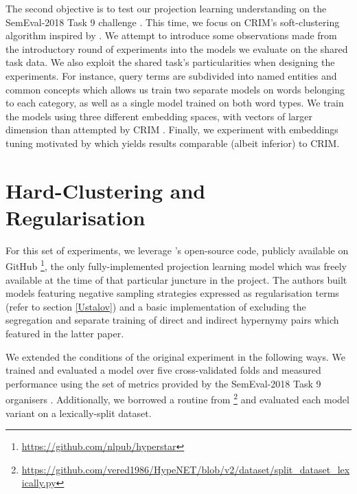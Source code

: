 The second objective is to test our projection learning understanding on the SemEval-2018 Task 9 challenge \citep{camacho2018semeval}.  This time, we focus on CRIM's soft-clustering algorithm \citep{bernier2018crim} inspired by \citep{yamane2016distributional}.  We attempt to introduce some observations made from the introductory round of experiments into the models we evaluate on the shared task data.  We also exploit the shared task's particularities when designing the experiments.  For instance, query terms are subdivided into named entities and common concepts which allows us train two separate models on words belonging to each category, as well as a single model trained on both word types.  We train the models using three different embedding spaces, with vectors of larger dimension than attempted by CRIM \citep{bernier2018crim}.  Finally, we experiment with embeddings tuning motivated by \citep{howard2018universal} which yields results comparable (albeit inferior) to CRIM.  


\section{Hard-Clustering and Regularisation} \label{ustalov_experiment}
For this set of experiments, we leverage \citeauthor{ustalov2017negative}'s open-source code, publicly available on GitHub \footnote{\url{https://github.com/nlpub/hyperstar}}, the only fully-implemented projection learning model which was freely available at the time of that particular juncture in the project.  The authors built models featuring  negative sampling strategies expressed as regularisation terms (refer to section \ref{Ustalov}) and a basic implementation of \citep{Fu2014} excluding the segregation and separate training of direct and indirect hypernymy pairs which featured in the latter paper.

We extended the conditions of the original experiment in the following ways.  We trained and evaluated a model over five cross-validated folds and measured performance using the set of metrics provided by the SemEval-2018 Task 9 organisers \citep{camacho2018semeval}.  Additionally, we borrowed a routine from \citep{shwartz2016path} \footnote{\url{https://github.com/vered1986/HypeNET/blob/v2/dataset/split_dataset_lexically.py}} and evaluated each model variant on a lexically-split dataset.  


